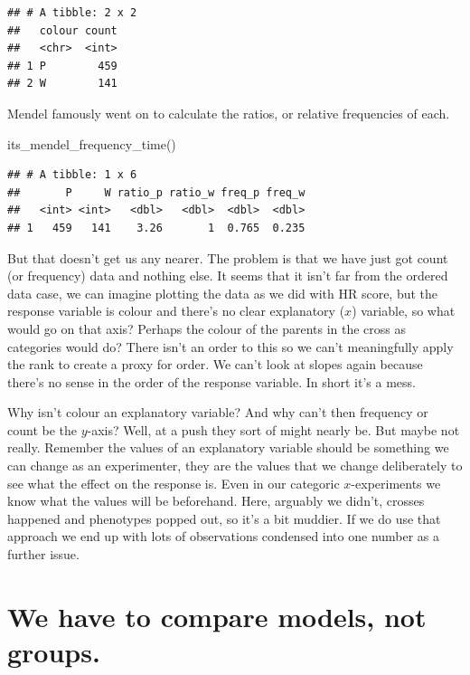 \documentclass[
]{book}
\newenvironment{Shaded}{\begin{snugshade}}{\end{snugshade}}
\newcommand{\FunctionTok}[1]{\textcolor[rgb]{0.00,0.00,0.00}{#1}}
\newcommand{\NormalTok}[1]{#1}
\newenvironment{sidenote}
{ \begin{tcolorbox}[colbacktitle=blue!50!white,
title=huh?,coltitle=white,
fonttitle=\bfseries] }
{  \end{tcolorbox} }
\begin{document}
\begin{verbatim}
## # A tibble: 2 x 2
##   colour count
##   <chr>  <int>
## 1 P        459
## 2 W        141
\end{verbatim}

Mendel famously went on to calculate the ratios, or relative frequencies of each.

\begin{Shaded}
\begin{Highlighting}[]
\FunctionTok{its\_mendel\_frequency\_time}\NormalTok{()}
\end{Highlighting}
\end{Shaded}

\begin{verbatim}
## # A tibble: 1 x 6
##       P     W ratio_p ratio_w freq_p freq_w
##   <int> <int>   <dbl>   <dbl>  <dbl>  <dbl>
## 1   459   141    3.26       1  0.765  0.235
\end{verbatim}

But that doesn't get us any nearer. The problem is that we have just got count (or frequency) data and nothing else. It seems that it isn't far from the ordered data case, we can imagine plotting the data as we did with HR score, but the response variable is colour and there's no clear explanatory (\(x\)) variable, so what would go on that axis? Perhaps the colour of the parents in the cross as categories would do? There isn't an order to this so we can't meaningfully apply the rank to create a proxy for order. We can't look at slopes again because there's no sense in the order of the response variable. In short it's a mess.

\begin{sidenote}
Why isn't colour an explanatory variable? And why can't then frequency or count be the \(y\)-axis? Well, at a push they sort of might nearly be. But maybe not really. Remember the values of an explanatory variable should be something we can change as an experimenter, they are the values that we change deliberately to see what the effect on the response is. Even in our categoric \(x\)-experiments we know what the values will be beforehand. Here, arguably we didn't, crosses happened and phenotypes popped out, so it's a bit muddier. If we do use that approach we end up with lots of observations condensed into one number as a further issue.
\end{sidenote}

\hypertarget{we-have-to-compare-models-not-groups.}{%
\section{We have to compare models, not groups.}\label{we-have-to-compare-models-not-groups.}}
\end{document}
